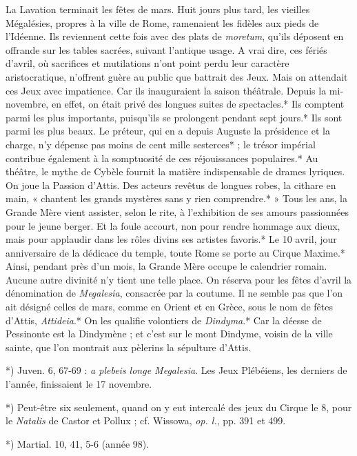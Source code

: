 \documentclass[a4paper, 11pt, oneside, polutonikogreek, french]{article}
\begin{document}
La Lavation terminait les fêtes de mars. Huit jours plus tard, les vieilles Mégalésies, propres à la ville de Rome, ramenaient les fidèles aux pieds de l'Idéenne. Ils reviennent cette fois avec des plats de \emph{moretum}, qu'ils déposent en offrande sur les tables sacrées, suivant l'antique usage. A vrai dire, ces fériés d'avril, où sacrifices et mutilations n'ont point perdu leur caractère aristocratique, n'offrent guère au public que battrait des Jeux. Mais on attendait ces Jeux avec impatience. Car ils inauguraient la saison théâtrale. Depuis la mi-novembre, en effet, on était privé des longues suites de spectacles.* Ils comptent parmi les plus importants, puisqu'ils se prolongent pendant sept jours.* Ils sont parmi les plus beaux. Le préteur, qui en a depuis Auguste la présidence et la charge, n'y dépense pas moins de cent mille sesterces* ; le trésor impérial contribue également à la somptuosité de ces réjouissances populaires.* Au théâtre, le mythe de Cybèle fournit la matière indispensable de drames lyriques. On joue la Passion d'Attis. Des acteurs revêtus de longues robes, la cithare en main, « chantent les grands mystères sans y rien comprendre.* » Tous les ans, la Grande Mère vient assister, selon le rite, à l'exhibition de ses amours passionnées pour le jeune berger. Et la foule accourt, non pour rendre hommage aux dieux, mais pour applaudir dans les rôles divins ses artistes favoris.* Le 10 avril, jour anniversaire de la dédicace du temple, toute Rome se porte au Cirque Maxime.* Ainsi, pendant près d'un mois, la Grande Mère occupe le calendrier romain. Aucune autre divinité n'y tient une telle place. On réserva pour les fêtes d'avril la dénomination de \emph{Megalesia}, consacrée par la coutume. Il ne semble pas que l'on ait désigné celles de mars, comme en Orient et en Grèce, sous le nom de fêtes d'Attis, \emph{Attideia}.* On les qualifie volontiers de \emph{Dindyma}.* Car la déesse de Pessinonte est la Dindymène ; et c'est sur le mont Dindyme, voisin de la ville sainte, que l'on montrait aux pèlerins la sépulture d'Attis.

*) Juven. 6, 67-69 : \emph{a plebeis longe Megalesia}. Les Jeux Plébéiens, les derniers de l'année, finissaient le 17 novembre.

*) Peut-être six seulement, quand on y eut intercalé des jeux du Cirque le 8, pour le \emph{Natalis} de Castor et Pollux ; cf. Wissowa, \emph{op. l.}, pp. 391 et 499.

*) Martial. 10, 41, 5-6 (année 98).
\end{document}
